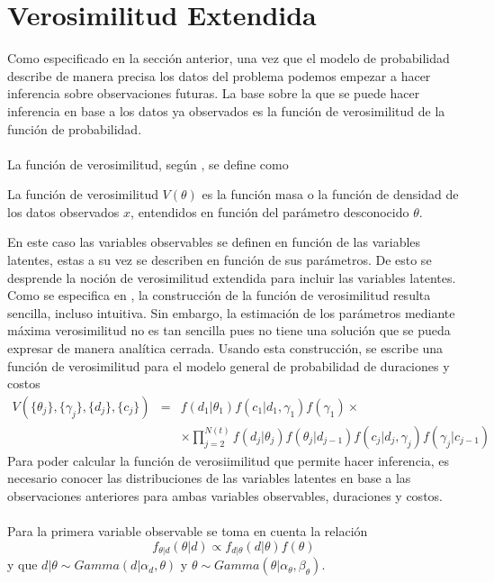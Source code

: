 \section{Verosimilitud Extendida}
Como especificado en la secci\'on anterior, una vez que el modelo de probabilidad describe de manera precisa los datos del problema podemos empezar a hacer inferencia sobre observaciones futuras. La base sobre la que se puede hacer inferencia en base a los datos ya observados es la funci\'on de verosimilitud de la funci\'on de probabilidad.\\
\\
La funci\'on de verosimilitud, seg\'un \cite{held2014applied}, se define como
\begin{defi}
La funci\'on de verosimilitud $V(\theta)$ es la funci\'on masa o la funci\'on de densidad de los datos observados $x$, entendidos en funci\'on del par\'ametro desconocido $\theta$.
\end{defi}
En este caso las variables observables se definen en funci\'on de las variables latentes, estas a su vez se describen en funci\'on de sus par\'ametros. De esto se desprende la noci\'on de verosimilitud extendida para incluir las variables latentes. Como se especifica en \cite{pitt2002constructing}, la construcci\'on de la funci\'on de verosimilitud resulta sencilla, incluso intuitiva. Sin embargo, la estimaci\'on de los par\'ametros mediante m\'axima verosimilitud no es tan sencilla pues no tiene una soluci\'on que se pueda expresar de manera anal\'itica cerrada. Usando esta construcci\'on, se escribe una funci\'on de verosimilitud para el modelo general de probabilidad de duraciones y costos\\
\begin{eqnarray}
V(\{\theta_j\},\{\gamma_j\},\{d_j\},\{c_j\}) &=& f(d_1|\theta_1)f(c_1|d_1,\gamma_1)f(\gamma_1) \times\nonumber\\
&& \times \prod_{j=2}^{N(t)} f(d_j|\theta_j)f(\theta_j|d_{j-1})f(c_j|d_j,\gamma_j)f(\gamma_j|c_{j-1})\nonumber
\end{eqnarray}
Para poder calcular la funci\'on de verosiimilitud que permite hacer inferencia, es necesario conocer las distribuciones de las variables latentes en base a las observaciones anteriores para ambas variables observables, duraciones y costos.\\
\\Para la primera variable observable se toma en cuenta la relaci\'on 
\[f_{\theta|d}(\theta|d)\propto f_{d|\theta}(d|\theta)f(\theta)\]
y que $d|\theta \sim Gamma(d|\alpha_d,\theta)$ y $\theta \sim Gamma(\theta|\alpha_\theta,\beta_\theta)$.

